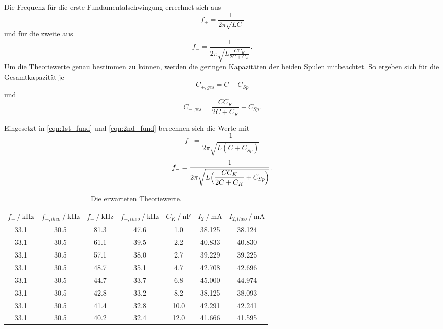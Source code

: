 Die Frequenz für die erste Fundamentalschwingung errechnet sich aus 
\begin{equation}
    \label{eqn:1st_fund}
    f_+ = \frac{1}{2\pi\sqrt{LC}}
\end{equation}
und für die zweite aus
\begin{equation}
    \label{eqn:2nd_fund}
    f_- = \frac{1}{2\pi\sqrt{L\frac{CC_K}{2C+C_K}}}.
\end{equation}
Um die Theoriewerte genau bestimmen zu können, werden die geringen Kapazitäten der beiden Spulen mitbeachtet.
So ergeben sich für die Gesamtkapazität je 
\begin{equation}
    C_{+, ges} = C + C_{Sp}
\end{equation}
und
\begin{equation}
    C_{-, ges} = \frac{CC_K}{2C+C_K} + C_{Sp}.
\end{equation}

Eingesetzt in \eqref{eqn:1st_fund} und \eqref{eqn:2nd_fund} berechnen sich die Werte mit
\begin{equation}
    \label{eqn:1st_fund_Csp}
    f_+ = \frac{1}{2\pi\sqrt{L(C + C_{Sp})}}
\end{equation}
\begin{equation}
    \label{eqn:2nd_fund_Csp}
    f_- = \frac{1}{2\pi\sqrt{L\Bigl(\dfrac{CC_K}{2C+C_K} + C_{Sp}\Bigr)}}.
\end{equation}

\begin{table}
    \centering
    \caption{Die erwarteten Theoriewerte.}
    \label{tab:theorie}
    \begin{tabular}{c c c c c c c}
        \toprule
        $f_- \:/\: \si{\kilo\hertz}$ & $f_{-, theo} \:/\: \si{\kilo\hertz}$ & $f_+ \:/\: \si{\kilo\hertz}$ & $f_{+, theo} \:/\: \si{\kilo\hertz}$ & $C_K \:/\: \si{\nano\farad}$ & $I_2 \:/\: \si{\milli\ampere}$ & $I_{2,theo} \:/\: \si{\milli\ampere}$ \\
        \midrule
        33.1 & 30.5 & 81.3 & 47.6 & 1.0  &  38.125 & 38.124 \\  
        33.1 & 30.5 & 61.1 & 39.5 & 2.2  &  40.833 & 40.830 \\
        33.1 & 30.5 & 57.1 & 38.0 & 2.7  &  39.229 & 39.225 \\
        33.1 & 30.5 & 48.7 & 35.1 & 4.7  &  42.708 & 42.696 \\
        33.1 & 30.5 & 44.7 & 33.7 & 6.8  &  45.000 & 44.974 \\
        33.1 & 30.5 & 42.8 & 33.2 & 8.2  &  38.125 & 38.093 \\
        33.1 & 30.5 & 41.4 & 32.8 & 10.0 &  42.291 & 42.241 \\
        33.1 & 30.5 & 40.2 & 32.4 & 12.0 &  41.666 & 41.595 \\
        \bottomrule
    \end{tabular}
\end{table}

\pagebreak